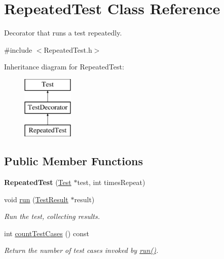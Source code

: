 \hypertarget{class_repeated_test}{\section{Repeated\-Test Class Reference}
\label{class_repeated_test}
}


Decorator that runs a test repeatedly.  




{\ttfamily \#include $<$Repeated\-Test.\-h$>$}

Inheritance diagram for Repeated\-Test\-:\begin{figure}[H]
\begin{center}
\leavevmode
\includegraphics[height=3.000000cm]{class_repeated_test}
\end{center}
\end{figure}
\subsection*{Public Member Functions}
\begin{DoxyCompactItemize}
\item 
\hypertarget{class_repeated_test_a73cf84a81085a1e93f21f2f4d2a14bc6}{{\bfseries Repeated\-Test} (\hyperlink{class_test}{Test} $\ast$test, int times\-Repeat)}\label{class_repeated_test_a73cf84a81085a1e93f21f2f4d2a14bc6}

\item 
\hypertarget{class_repeated_test_a6faffcd29b619305a75dd4c1995beaad}{void \hyperlink{class_repeated_test_a6faffcd29b619305a75dd4c1995beaad}{run} (\hyperlink{class_test_result}{Test\-Result} $\ast$result)}\label{class_repeated_test_a6faffcd29b619305a75dd4c1995beaad}

\begin{DoxyCompactList}\small\item\em Run the test, collecting results. \end{DoxyCompactList}\item 
int \hyperlink{class_repeated_test_a2bacf360b91cc6a0c52ec9e75ceae5a6}{count\-Test\-Cases} () const 
\begin{DoxyCompactList}\small\item\em Return the number of test cases invoked by \hyperlink{class_repeated_test_a6faffcd29b619305a75dd4c1995beaad}{run()}. \end{DoxyCompactList}\end{DoxyCompactItemize}
